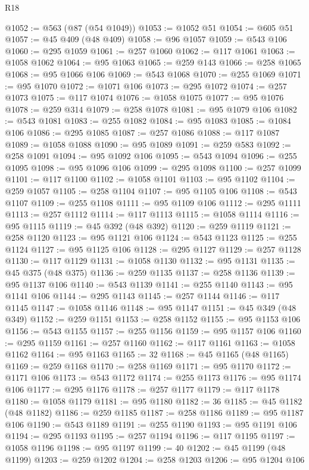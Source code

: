 \begin{lexlean}{R18}
\begin{coremodule}
@1052 := @563 (@87 (@54 @1049))
@1053 := @1052 @51
@1054 := @605 @51
@1057 := @45 @409 (@48 @409)
@1058 := @96 @1057
@1059 := @543 @106
@1060 := @295 @1059
@1061 := @257 @1060
@1062 := @117 @1061
@1063 := @1058 @1062
@1064 := @95 @1063
@1065 := @259 @143
@1066 := @258 @1065
@1068 := @95 @1066 @106
@1069 := @543 @1068
@1070 := @255 @1069
@1071 := @95 @1070
@1072 := @1071 @106
@1073 := @295 @1072
@1074 := @257 @1073
@1075 := @117 @1074
@1076 := @1058 @1075
@1077 := @95 @1076
@1078 := @259 @314
@1079 := @258 @1078
@1081 := @95 @1079 @106
@1082 := @543 @1081
@1083 := @255 @1082
@1084 := @95 @1083
@1085 := @1084 @106
@1086 := @295 @1085
@1087 := @257 @1086
@1088 := @117 @1087
@1089 := @1058 @1088
@1090 := @95 @1089
@1091 := @259 @583
@1092 := @258 @1091
@1094 := @95 @1092 @106
@1095 := @543 @1094
@1096 := @255 @1095
@1098 := @95 @1096 @106
@1099 := @295 @1098
@1100 := @257 @1099
@1101 := @117 @1100
@1102 := @1058 @1101
@1103 := @95 @1102
@1104 := @259 @1057
@1105 := @258 @1104
@1107 := @95 @1105 @106
@1108 := @543 @1107
@1109 := @255 @1108
@1111 := @95 @1109 @106
@1112 := @295 @1111
@1113 := @257 @1112
@1114 := @117 @1113
@1115 := @1058 @1114
@1116 := @95 @1115
@1119 := @45 @392 (@48 @392)
@1120 := @259 @1119
@1121 := @258 @1120
@1123 := @95 @1121 @106
@1124 := @543 @1123
@1125 := @255 @1124
@1127 := @95 @1125 @106
@1128 := @295 @1127
@1129 := @257 @1128
@1130 := @117 @1129
@1131 := @1058 @1130
@1132 := @95 @1131
@1135 := @45 @375 (@48 @375)
@1136 := @259 @1135
@1137 := @258 @1136
@1139 := @95 @1137 @106
@1140 := @543 @1139
@1141 := @255 @1140
@1143 := @95 @1141 @106
@1144 := @295 @1143
@1145 := @257 @1144
@1146 := @117 @1145
@1147 := @1058 @1146
@1148 := @95 @1147
@1151 := @45 @349 (@48 @349)
@1152 := @259 @1151
@1153 := @258 @1152
@1155 := @95 @1153 @106
@1156 := @543 @1155
@1157 := @255 @1156
@1159 := @95 @1157 @106
@1160 := @295 @1159
@1161 := @257 @1160
@1162 := @117 @1161
@1163 := @1058 @1162
@1164 := @95 @1163
@1165 := 32
@1168 := @45 @1165 (@48 @1165)
@1169 := @259 @1168
@1170 := @258 @1169
@1171 := @95 @1170
@1172 := @1171 @106
@1173 := @543 @1172
@1174 := @255 @1173
@1176 := @95 @1174 @106
@1177 := @295 @1176
@1178 := @257 @1177
@1179 := @117 @1178
@1180 := @1058 @1179
@1181 := @95 @1180
@1182 := 36
@1185 := @45 @1182 (@48 @1182)
@1186 := @259 @1185
@1187 := @258 @1186
@1189 := @95 @1187 @106
@1190 := @543 @1189
@1191 := @255 @1190
@1193 := @95 @1191 @106
@1194 := @295 @1193
@1195 := @257 @1194
@1196 := @117 @1195
@1197 := @1058 @1196
@1198 := @95 @1197
@1199 := 40
@1202 := @45 @1199 (@48 @1199)
@1203 := @259 @1202
@1204 := @258 @1203
@1206 := @95 @1204 @106

\end{coremodule}
\end{lexlean}
